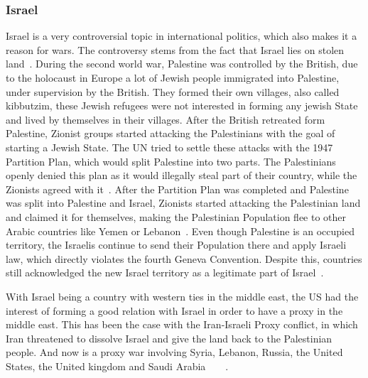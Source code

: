 \subsubsection{Israel} %
Israel is a very controversial topic in international politics, which also makes it a reason for wars. The controversy stems from the fact that Israel lies on stolen land~\cite{aljazeera-israel-illegal-settlement}.
During the second world war, Palestine was controlled by the British, due to the holocaust in Europe a lot of Jewish people immigrated into Palestine, under supervision by the British. They formed their own villages, also called kibbutzim, these Jewish refugees were not interested in forming any jewish State and lived by themselves in their villages. After the British retreated form Palestine, Zionist groups started attacking the Palestinians with the goal of starting a Jewish State. The UN tried to settle these attacks with the 1947 Partition Plan, which would split Palestine into two parts. The Palestinians openly denied this plan as it would illegally steal part of their country, while the Zionists agreed with it~\cite{aljazeera-israel-illegal-settlement}.
After the Partition Plan was completed and Palestine was split into Palestine and Israel, Zionists started attacking the Palestinian land and claimed it for themselves, making the Palestinian Population flee to other Arabic countries like Yemen or Lebanon~\cite{aljazeera-israel-illegal-settlement}. 
Even though Palestine is an occupied territory, the Israelis continue to send their Population there and apply Israeli law, which directly violates the fourth Geneva Convention. Despite this, countries still acknowledged the new Israel territory as a legitimate part of Israel~\cite{aljazeera-israel-illegal-settlement}.

With Israel being a country with western ties in the middle east, the US had the interest of forming a good relation with Israel in order to have a proxy in the middle east. This has been the case with the Iran-Israeli Proxy conflict, in which Iran threatened to dissolve Israel and give the land back to the Palestinian people. And now is a proxy war involving Syria, Lebanon, Russia, the United States, the United kingdom and Saudi Arabia~\cite{aljazeera-israel-iran-shadow}~\cite{smh-shadow-war-israel-iran}~\cite{lemonde-shadow-war-israel-iran}~\cite{time-shadow-war-israel-iran}.